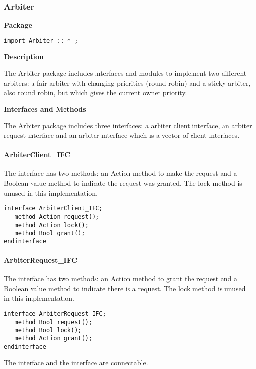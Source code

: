 \subsubsection{Arbiter}
\label{sec-Arbiter}

{\bf Package}
\begin{verbatim}
import Arbiter :: * ;
\end{verbatim}


{\bf Description}

The Arbiter package includes interfaces and modules to implement two
different arbiters: a fair arbiter with changing priorities (round
robin) and a sticky arbiter, also round robin, but which gives the current owner priority.


{\bf Interfaces and Methods}

The Arbiter package includes three interfaces: a arbiter client
interface, an arbiter request interface and an arbiter interface which
is a vector of client interfaces.

\paragraph{\bf ArbiterClient\_IFC} The 
interface has two
methods: an Action method to make the  request and a Boolean value method
to indicate the request was granted. The lock method is unused in this 
implementation.

\begin{verbatim}
interface ArbiterClient_IFC;
   method Action request();
   method Action lock();
   method Bool grant();
endinterface
\end{verbatim}

\paragraph{ArbiterRequest\_IFC} The 
   interface has
   two methods: an Action method to grant the request and a Boolean
   value method to indicate there is a request. The lock method is
   unused in this implementation.

\begin{verbatim}
interface ArbiterRequest_IFC;
   method Bool request();
   method Bool lock();
   method Action grant();
endinterface
\end{verbatim}

The  interface and the 
interface are connectable.

